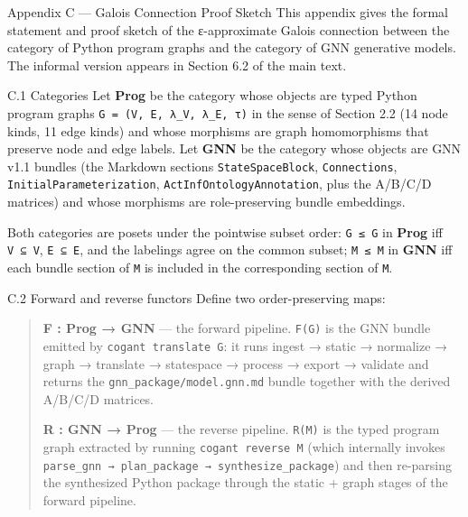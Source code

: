 \documentclass[
  ignorenonframetext,
]{beamer}
\author{\texorpdfstring{}{}}
\date{}
\begin{document}
\begin{frame}[fragile]{Appendix C --- Galois Connection Proof Sketch}
\protect{}\label{appendix-c-galois-connection-proof-sketch}
This appendix gives the formal statement and proof sketch of the
ε-approximate Galois connection between the category of Python program
graphs and the category of GNN generative models. The informal version
appears in Section 6.2 of the main text.

\begin{block}{C.1 Categories}
\protect{}\label{c.1-categories}
Let \textbf{Prog} be the category whose objects are typed Python program
graphs \texttt{G\ =\ (V,\ E,\ λ\_V,\ λ\_E,\ τ)} in the sense of Section
2.2 (14 node kinds, 11 edge kinds) and whose morphisms are graph
homomorphisms that preserve node and edge labels. Let \textbf{GNN} be
the category whose objects are GNN v1.1 bundles (the Markdown sections
\texttt{StateSpaceBlock}, \texttt{Connections},
\texttt{InitialParameterization}, \texttt{ActInfOntologyAnnotation},
plus the A/B/C/D matrices) and whose morphisms are role-preserving
bundle embeddings.

Both categories are posets under the pointwise subset order:
\texttt{G\ ≤\ G\textquotesingle{}} in \textbf{Prog} iff
\texttt{V\ ⊆\ V\textquotesingle{}}, \texttt{E\ ⊆\ E\textquotesingle{}},
and the labelings agree on the common subset;
\texttt{M\ ≤\ M\textquotesingle{}} in \textbf{GNN} iff each bundle
section of \texttt{M} is included in the corresponding section of
\texttt{M\textquotesingle{}}.
\end{block}

\begin{block}{C.2 Forward and reverse functors}
\protect{}\label{c.2-forward-and-reverse-functors}
Define two order-preserving maps:

\begin{quote}
\textbf{F : Prog → GNN} --- the forward pipeline. \texttt{F(G)} is the
GNN bundle emitted by \texttt{cogant\ translate\ G}: it runs ingest →
static → normalize → graph → translate → statespace → process → export →
validate and returns the \texttt{gnn\_package/model.gnn.md} bundle
together with the derived A/B/C/D matrices.

\textbf{R : GNN → Prog} --- the reverse pipeline. \texttt{R(M)} is the
typed program graph extracted by running \texttt{cogant\ reverse\ M}
(which internally invokes
\texttt{parse\_gnn\ →\ plan\_package\ →\ synthesize\_package}) and then
re-parsing the synthesized Python package through the static + graph
stages of the forward pipeline.
\end{quote}


\end{block}
\end{frame}
\end{document}
